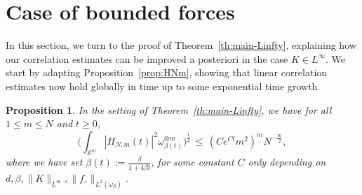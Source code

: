\documentclass[a4paper,11pt,reqno,noindent]{amsart}
\theoremstyle{plain}
\newtheorem{prop}[theor]{Proposition}
\theoremstyle{definition}
\numberwithin{equation}{section}
\newcommand{\Xd}{\mathbb X}
\begin{document}
\section{Case of bounded forces}\label{sec:Linfty}
In this section, we turn to the proof of Theorem~\ref{th:main-Linfty}, explaining how our correlation estimates can be improved a posteriori in the case $K\in L^\infty$.
We start by adapting Proposition~\ref{prop:HNm}, showing that linear correlation estimates now hold globally in time up to some exponential time growth.

\begin{prop}\label{prop:HNm-re}
In the setting of Theorem~\ref{th:main-Linfty}, we have for all $1\le m\le N$ and $t\ge0$,
\[\Big(\int_{\Xd^m}|H_{N,m}(t)|^2\omega_{\beta(t)}^{\otimes m}\Big)^\frac12\,\le\,(Ce^{Ct}m^2)^mN^{-\frac m2},\]
where we have set $\beta(t):=\frac\beta{1+4\beta t}$, for some constant $C$ only depending on $d,\beta,\|K\|_{L^\infty},\|f_\circ\|_{L^2(\omega_\beta)}$.
\end{prop}
\end{document}
